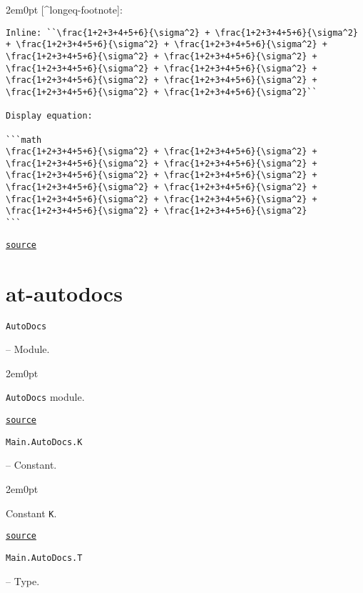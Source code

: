 \begin{adjustwidth}{2em}{0pt}
[{\textasciicircum}longeq-footnote]:


\begin{verbatim}
Inline: ``\frac{1+2+3+4+5+6}{\sigma^2} + \frac{1+2+3+4+5+6}{\sigma^2} + \frac{1+2+3+4+5+6}{\sigma^2} + \frac{1+2+3+4+5+6}{\sigma^2} + \frac{1+2+3+4+5+6}{\sigma^2} + \frac{1+2+3+4+5+6}{\sigma^2} + \frac{1+2+3+4+5+6}{\sigma^2} + \frac{1+2+3+4+5+6}{\sigma^2} + \frac{1+2+3+4+5+6}{\sigma^2} + \frac{1+2+3+4+5+6}{\sigma^2} + \frac{1+2+3+4+5+6}{\sigma^2} + \frac{1+2+3+4+5+6}{\sigma^2}``

Display equation:

```math
\frac{1+2+3+4+5+6}{\sigma^2} + \frac{1+2+3+4+5+6}{\sigma^2} + \frac{1+2+3+4+5+6}{\sigma^2} + \frac{1+2+3+4+5+6}{\sigma^2} + \frac{1+2+3+4+5+6}{\sigma^2} + \frac{1+2+3+4+5+6}{\sigma^2} + \frac{1+2+3+4+5+6}{\sigma^2} + \frac{1+2+3+4+5+6}{\sigma^2} + \frac{1+2+3+4+5+6}{\sigma^2} + \frac{1+2+3+4+5+6}{\sigma^2} + \frac{1+2+3+4+5+6}{\sigma^2} + \frac{1+2+3+4+5+6}{\sigma^2}
```
\end{verbatim}



\href{https://example.org/Repository.jl/blob/test/examples/make.jl#L41-71}{\texttt{source}}


\end{adjustwidth}

\section{at-autodocs}



\label{17848419264812669351}{}

\hypertarget{11302554442225637105}{\texttt{AutoDocs}}  -- {Module.}

\begin{adjustwidth}{2em}{0pt}

\texttt{AutoDocs} module.



\href{https://example.org/Repository.jl/blob/test/examples/make.jl#L75-75}{\texttt{source}}


\end{adjustwidth}
\hypertarget{15441025252371609530}{\texttt{Main.AutoDocs.K}}  -- {Constant.}

\begin{adjustwidth}{2em}{0pt}

Constant \texttt{K}.



\href{https://example.org/Repository.jl/blob/test/examples/make.jl#L88-88}{\texttt{source}}


\end{adjustwidth}
\hypertarget{12338358314596597808}{\texttt{Main.AutoDocs.T}}  -- {Type.}

